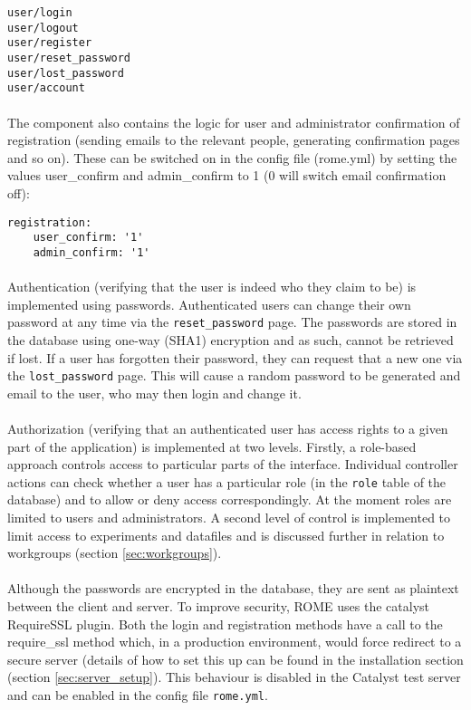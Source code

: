 \begin{verbatim}
user/login
user/logout
user/register
user/reset_password
user/lost_password
user/account
\end{verbatim}

\paragraph{}
The component also contains the logic for user and administrator confirmation of registration (sending emails to the relevant people, generating confirmation pages and so on). These can be switched on in the config file (rome.yml) by setting the values user\_confirm and admin\_confirm to 1 (0 will switch email confirmation off):

\begin{verbatim}
registration:
    user_confirm: '1'
    admin_confirm: '1'
\end{verbatim}


\paragraph{}
Authentication (verifying that the user is indeed who they claim to be) is implemented using passwords. Authenticated users can change their own password at any time via the \texttt{reset\_password} page. The passwords are stored in the database using one-way (SHA1) encryption and as such, cannot be retrieved if lost. If a user has forgotten their password, they can request that a new one via the \texttt{lost\_password} page. This will cause a random password to be generated and email to the user, who may then login and change it.

\paragraph{}
Authorization (verifying that an authenticated user has access rights to a given part of the application) is implemented at two levels. Firstly, a role-based approach controls access to particular parts of the interface. Individual controller actions can check whether a user has a particular role (in the \texttt{role} table of the database) and to allow or deny access correspondingly. At the moment roles are limited to users and administrators. A second level of control is implemented to limit access to experiments and datafiles and is discussed further in relation to workgroups (section \ref{sec:workgroups}).

\paragraph*{}
Although the passwords are encrypted in the database, they are sent as plaintext between the client and server. To improve security, ROME uses the catalyst RequireSSL plugin. Both the login and registration methods have a call to the require\_ssl method which, in a production environment, would force redirect to a secure server (details of how to set this up can be found in the installation section (section \ref{sec:server_setup}). This behaviour is disabled in the Catalyst test server and can be enabled in the config file \texttt{rome.yml}.

